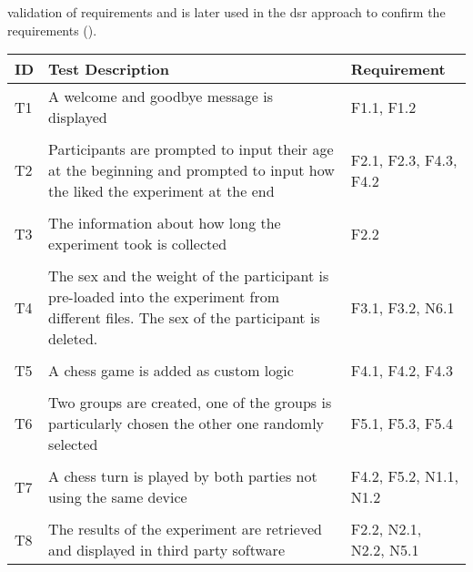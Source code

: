 validation of requirements and is later used in the \ac{dsr} approach to confirm the requirements (\cite{Sommerville.2011}).

\begin{table}[htbp]
    \centering
    \small
    \begin{tabular}{L{0.04\textwidth}L{0.7\textwidth}L{0.15\textwidth}}
    \hline
    ID  & Test Description                                                                                                                                     & Requirement                  \\ \hline
    T1  & A welcome and goodbye message is displayed                                                                                               & F1.1, F1.2                 \\
    & \\
    T2  & Participants are prompted to input their age at the beginning and prompted to input how the liked the experiment at the end              & F2.1, F2.3, F4.3, F4.2 \\
    & \\
    T3  & The information about how long the experiment took is collected                                                                          & F2.2                         \\
    & \\
    T4  & The sex and the weight of the participant is pre-loaded into the experiment from different files. The sex of the participant is deleted. & F3.1, F3.2, N6.1                         \\
    & \\
    T5  & A chess game is added as custom logic                                                                                                    &  F4.1, F4.2, F4.3         \\
    & \\
    T6  & Two groups are created, one of the groups is particularly chosen the other one randomly selected                                           & F5.1, F5.3, F5.4         \\
    & \\
    T7  & A chess turn is played by both parties not using the same device                                                                         & F4.2, F5.2, N1.1, N1.2         \\
    & \\
    T8  & The results of the experiment are retrieved and displayed in third party software                                                        & F2.2, N2.1, N2.2, N5.1                \\

\end{tabular}
\end{table}

